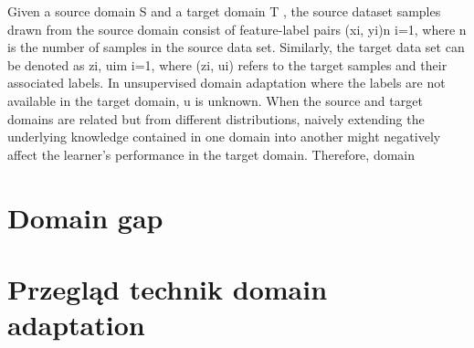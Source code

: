             Given a source domain S and a target domain T , the source dataset samples drawn from the source domain consist of
feature-label pairs {(xi, yi)}n
i=1, where n is the number of samples in the source data set. Similarly, the target data set
can be denoted as {zi, ui}m
i=1, where (zi, ui) refers to the target samples and their associated labels. In unsupervised
domain adaptation where the labels are not available in the target domain, u is unknown. When the source and
target domains are related but from different distributions, naively extending the underlying knowledge contained in
one domain into another might negatively affect the learner’s performance in the target domain. Therefore, domain

            
    \pagebreak 
    \section{Domain gap}
        \pagebreak
    \section{Przegląd technik domain adaptation}
        \pagebreak
